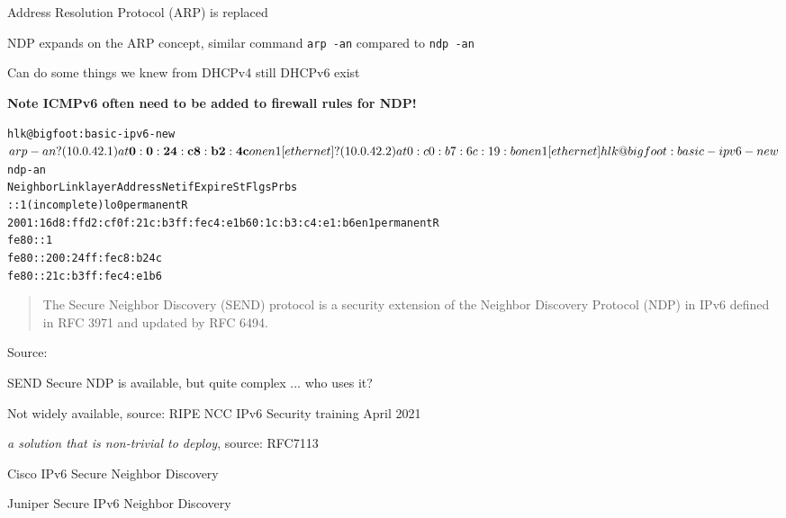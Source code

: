 \documentclass[Screen16to9,17pt]{foils}
\newcommand{\myalert}{\color{red}\faFlag}
\begin{document}


\begin{list1}
\item Address Resolution Protocol (ARP) is replaced
\item NDP expands on the ARP concept, similar command \verb+arp -an+ compared to \verb+ndp -an+
\item Can do some things we knew from DHCPv4 still DHCPv6 exist
\item {\bf Note ICMPv6 often need to be added to firewall rules for NDP!} {\myalert}
\end{list1}


\begin{alltt}
\small
hlk@bigfoot:basic-ipv6-new$ arp -an
? (10.0.42.1) at{\bf 0:0:24:c8:b2:4c} on en1 [ethernet]
? (10.0.42.2) at 0:c0:b7:6c:19:b on en1 [ethernet]
hlk@bigfoot:basic-ipv6-new$ ndp -an
Neighbor                      Linklayer Address  Netif Expire    St Flgs Prbs
::1                           (incomplete)         lo0 permanent R
2001:16d8:ffd2:cf0f:21c:b3ff:fec4:e1b6 0:1c:b3:c4:e1:b6 en1 permanent R
fe80::1%lo0                   (incomplete)         lo0 permanent R
fe80::200:24ff:fec8:b24c%en1 {\bf 0:0:24:c8:b2:4c}      en1 8h54m51s  S  R
fe80::21c:b3ff:fec4:e1b6%en1  0:1c:b3:c4:e1:b6     en1 permanent R
\end{alltt}





\begin{quote}
The Secure Neighbor Discovery (SEND) protocol is a security extension of the Neighbor Discovery Protocol (NDP) in IPv6 defined in RFC 3971 and updated by RFC 6494.
\end{quote}
Source: 

\begin{list2}
\item SEND Secure NDP is available, but quite complex ... who uses it?
\item Not widely available, source: RIPE NCC IPv6 Security training April 2021
\item \emph{a solution that is non-trivial to deploy}, source: RFC7113
\item Cisco IPv6 Secure Neighbor Discovery\\{\footnotesize
{}}
\item Juniper Secure IPv6 Neighbor Discovery\\{\footnotesize
{}}
\end{list2}
\end{document}
